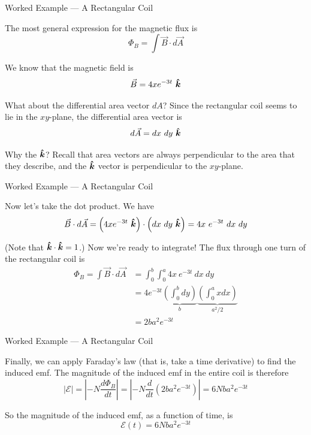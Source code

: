 \documentclass{beamer}
\begin{document}
\begin{frame}{Worked Example --- A Rectangular Coil}

The most general expression for the magnetic flux is
\begin{equation*}
	\Phi_B = \int \vec{B} \cdot d\vec{A}
\end{equation*}

We know that the magnetic field is
\begin{equation*}
	\vec{B} = 4x e^{-3t}\ \bm{\hat{k}}
\end{equation*}

What about the differential area vector $dA$? Since the rectangular coil seems to lie in the $xy$-plane, the differential area vector is
\begin{equation*}
	d\vec{A} = dx\ dy\ \bm{\hat{k}}
\end{equation*}

Why the $\bm{\hat{k}}$? Recall that area vectors are always perpendicular to the area that they describe, and the $\bm{\hat{k}}$ vector is perpendicular to the $xy$-plane.

\end{frame}

\begin{frame}{Worked Example --- A Rectangular Coil}

Now let's take the dot product. We have
\begin{gather*}
	\vec{B} \cdot d\vec{A} = \left( 4x e^{-3t}\ \bm{\hat{k}} \right) \cdot \left( dx\ dy\ \bm{\hat{k}} \right) = 4x\ e^{-3t}\ dx\ dy
\end{gather*}

(Note that $\bm{\hat{k}} \cdot \bm{\hat{k}} = 1$.) Now we're ready to integrate! The flux through one turn of the rectangular coil is
\begin{align*}
	\Phi_B = \int \vec{B} \cdot d\vec{A} &= \int_0^b \int_0^a 4x\ e^{-3t}\ dx\ dy \\
	&= 4 e^{-3t} \underbrace{\left( \int_0^b dy \right)}_{b} \underbrace{\left( \int_0^a x dx \right)}_{a^2/2} \\
	&= 2ba^2 e^{-3t}
\end{align*}

\end{frame}

\begin{frame}{Worked Example --- A Rectangular Coil}

Finally, we can apply Faraday's law (that is, take a time derivative) to find the induced emf. The magnitude of the induced emf in the entire coil is therefore
\begin{equation*}
    \left| \mathcal{E} \right| = \left| -N \frac{d\Phi_B}{dt} \right| = \left| -N \frac{d}{dt} \left( 2ba^2 e^{-3t} \right) \right| = 6 Nba^2 e^{-3t}
\end{equation*}

So the magnitude of the induced emf, as a function of time, is
\begin{equation*}
	\boxed{\mathcal{E}(t) = 6Nba^2 e^{-3t}}
\end{equation*}

\end{frame}
\end{document}
